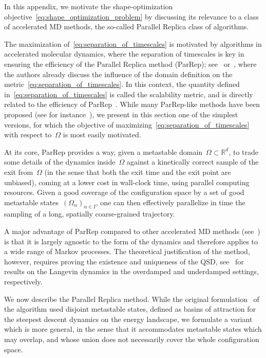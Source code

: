 \documentclass[a4]{article}
\newcommand{\R}{\mathbb{R}}
\newcommand{\1}{\mathbbm 1}
\begin{document}
In this appendix, we motivate the shape-optimization objective~\ref{eq:shape_optimization_problem} by discussing its relevance to a class of accelerated MD methods, the so-called Parallel Replica class of algorithms.

    The maximization of~\eqref{eq:separation_of_timescales} is motivated by algorithms in accelerated molecular dynamics, where the separation of timescales is key in ensuring the efficiency of the Parallel Replica method (ParRep); see~\cite[Section 6.2]{SL13} or~\cite[Section 2.7]{PUV15}, where the authors already discuss the influence of the domain definition on the metric~\eqref{eq:separation_of_timescales}.
    In this context, the quantity defined in~\eqref{eq:separation_of_timescales} is called the scalability metric, and is directly related to the efficiency of ParRep~\cite{V98}.
    While many ParRep-like methods have been proposed (see for instance~\cite{USV07,BLS15,A19,PCWKV16}), we present in this section one of the simplest versions, for which the objective of maximizing~\eqref{eq:separation_of_timescales} with respect to~$\Omega$ is most easily motivated.
    
    At its core, ParRep provides a way, given a metastable domain~$\Omega\subset\R^d$, to trade some details of the dynamics inside~$\Omega$ against a kinetically correct sample of the exit from~$\Omega$ (in the sense that both the exit time and the exit point are unbiased), coming at a lower cost in wall-clock time, using parallel computing resources.
    Given a good coverage of the configuration space by a set of good metastable states~$(\Omega_\alpha)_{\alpha\in I}$, one can then effectively parallelize in time the sampling of a long, spatially coarse-grained trajectory.

    A major advantage of ParRep compared to other accelerated MD methods (see~\cite{V97,SV00}) is that it is largely agnostic to the form of the dynamics and therefore applies to a wide range of Markov processes.
    The theoretical justification of the method, however, requires proving the existence and uniqueness of the QSD, see~\cite{LBLLP12,RLR22} for results on the Langevin dynamics in the overdamped and underdamped settings, respectively.
    
    We now describe the Parallel Replica method. While the original formulation~\cite{V98} of the algorithm used disjoint metastable states, defined as basins of attraction for the steepest descent dynamics on the energy landscape,
    we formulate a variant which is more general, in the sense that it accommodates metastable states which may overlap, and whose union does not necessarily cover the whole configuration space.
    
\end{document}
